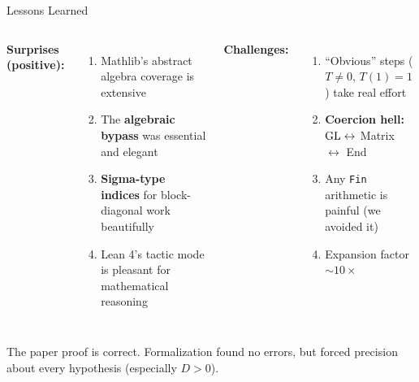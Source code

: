 \documentclass[aspectratio=169,10pt]{beamer}
\begin{document}
\begin{frame}{Lessons Learned}
\begin{columns}[T]
\textbf{\textcolor{leangreen}{Surprises (positive):}}
\begin{enumerate}
  \item Mathlib's abstract algebra coverage is extensive
  \item The \textbf{algebraic bypass} was essential and elegant
  \item \textbf{Sigma-type indices} for block-diagonal work beautifully
  \item Lean 4's tactic mode is pleasant for mathematical reasoning
\end{enumerate}

\textbf{\textcolor{amber}{Challenges:}}
\begin{enumerate}
  \item ``Obvious'' steps ($T\neq 0$, $T(1)=1$) take real effort
  \item \textbf{Coercion hell:} $\mathrm{GL} \leftrightarrow$ Matrix $\leftrightarrow$ End
  \item Any \texttt{Fin} arithmetic is painful (we avoided it)
  \item Expansion factor $\sim 10\times$
\end{enumerate}
\end{columns}

\vspace{0.8em}
The paper proof is correct. Formalization found no errors, but forced precision about every hypothesis (especially $D>0$).
\end{frame}
\end{document}
